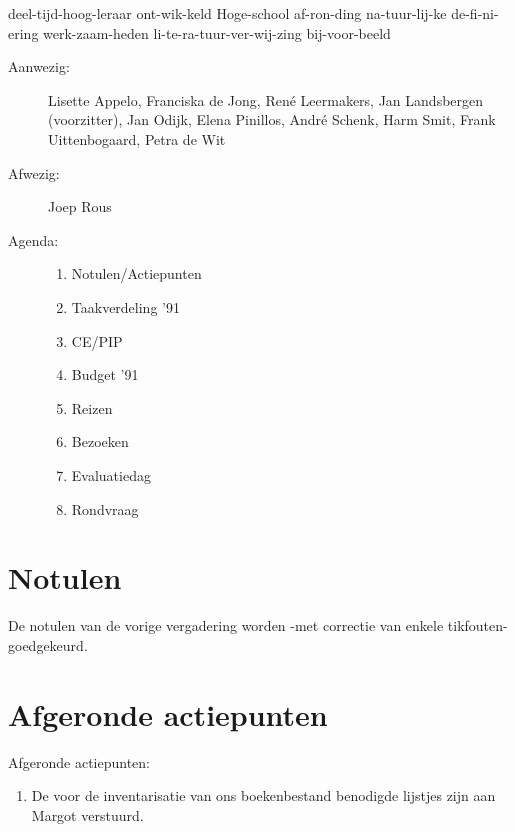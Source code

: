 
   \RosSupersedes{-}
   \MakeRosTitle
\hyphenation 
{deel-tijd-hoog-leraar
ont-wik-keld
Hoge-school
af-ron-ding
na-tuur-lij-ke
de-fi-ni-ering
werk-zaam-heden
li-te-ra-tuur-ver-wij-zing
bij-voor-beeld}

%
%
\begin{description}
\item[Aanwezig:] Lisette Appelo,
                 Franciska de Jong, Ren\'{e} Leermakers,  
                 Jan Landsbergen (voorzitter),   
                 Jan Odijk, Elena Pinillos, 
                 Andr\'{e} Schenk,
                 Harm Smit,
                 Frank Uittenbogaard, Petra de Wit
                  
                  

\item[Afwezig:]  Joep Rous
\item[Agenda:]\mbox{}
  \begin{enumerate}
  \item Notulen/Actiepunten
  \item Taakverdeling '91
  \item CE/PIP
  \item Budget '91
  \item Reizen
  \item Bezoeken
  \item Evaluatiedag
  \item Rondvraag
  \end{enumerate}
\end{description}

\section{Notulen}
De notulen van de vorige vergadering worden -met correctie van enkele 
tikfouten- goedgekeurd.

\section{Afgeronde actiepunten}

Afgeronde actiepunten:
\begin{enumerate}

  \item De voor de inventarisatie van ons boekenbestand benodigde lijstjes
        zijn aan Margot verstuurd. 
\end{enumerate}

